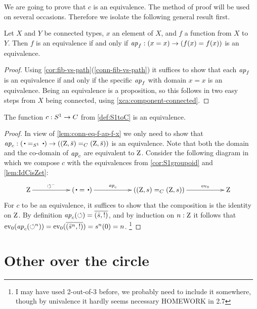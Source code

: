 We are going to prove that $c$ is an equivalence.
The method of proof will be used on several occasions.
Therefore we isolate the following general result first.

\begin{lemma}\label{lem:conn-eq-f-ap-f-x}
Let $X$ and $Y$ be connected types, $x$ an element of $X$,
and $f$ a function from $X$ to $Y$. Then $f$ is an equivalence
if and only if $\mathop{{\it ap}_{f}}: (x=x) \to (f(x)=f(x))$ is an equivalence.
\end{lemma} 
\begin{proof}
Using \cref{cor:fib-vs-path}(\ref{conn-fib-vs-path}) it suffices to show that 
each $\mathop{{\it ap}_{f}}$ is an equivalence if and only if the specific $\mathop{{\it ap}_{f}}$ with 
domain $x=x$ is an equivalence. Being an equivalence is a proposition, 
so this follows in two easy steps from $X$ being connected,
using \cref{xca:component-connected}.
\end{proof}

\begin{theorem}\label{thm:S1bysymmetries}
  The function $c:{S^1}\to C$ from \cref{def:S1toC} is an equivalence.
\end{theorem}
\begin{proof}
  In view of \cref{lem:conn-eq-f-ap-f-x} we only need to show that 
$\ap{c}:(\base=_{\Sc}\base)\to((\zet,\etop{s})=_C(\zet,\etop{s}))$ is an equivalence.
Note that both the domain and the co-domain of $\mathop{{\it ap}_{c}}$ are equivalent to $\mathrm{Z}$.
Consider the following diagram in which we compose $c$ with the equivalences
from \cref{cor:S1groupoid} and \cref{lem:IdCisZet}:
\[
\xymatrix{
\zet\ar[rr]^-{\Sloop^{{-}}}&&
(\base=\base)\ar[rr]^-{\ap{c}}&&
((\zet,s)=_C(\zet,s))\ar[rr]^-{\ev_0}&&
\zet}
\]
For $c$ to be an equivalence, it suffices to show that the composition
is the identity on $\mathrm{Z}$. By definition $\mathop{{\it ap}_{c}}(\circlearrowleft) = \overline{({\bar {s}},{!})}$, 
and by induction on $n:\mathrm{Z}$ it follows that
$\mathrm{ev}_0(\mathop{{\it ap}_{c}}(\circlearrowleft^n))=\mathrm{ev}_0(\overline{({\bar {s}^n},{!})}) = s^n(0) = n$. 
\footnote{I may have used 2-out-of-3 before, we probably need to include it somewhere, though by univalence it hardly seems necessary HOMEWORK in 2.7}
\end{proof}

\section{Other \coverings over the circle}
\label{sec:covS1}

